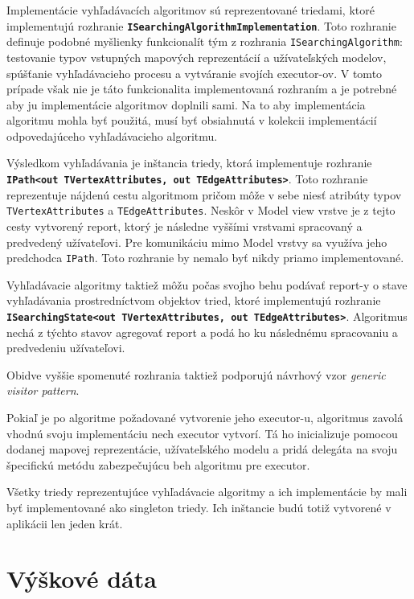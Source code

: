 Implementácie vyhľadávacích algoritmov sú reprezentované triedami, ktoré implementujú rozhranie \textbf{\texttt{ISearchingAlgorithmImplementation}}. Toto rozhranie definuje podobné myšlienky funkcionalít tým z rozhrania \texttt{ISearchingAlgorithm}: testovanie typov vstupných mapových reprezentácií a užívateľských modelov, spúšťanie vyhľadávacieho procesu a vytváranie svojích executor-ov. V tomto prípade však nie je táto funkcionalita implementovaná rozhraním a je potrebné aby ju implementácie algoritmov doplnili sami. Na to aby implementácia algoritmu mohla byť použitá, musí byť obsiahnutá v kolekcii implementácií odpovedajúceho vyhľadávacieho algoritmu. 

Výsledkom vyhľadávania je inštancia triedy, ktorá implementuje rozhranie \textbf{\texttt{IPath<out TVertexAttributes, out TEdgeAttributes>}}. Toto rozhranie reprezentuje nájdenú cestu algoritmom pričom môže v sebe niesť atribúty typov \texttt{TVertexAttributes} a \texttt{TEdgeAttributes}. Neskôr v Model view vrstve je z tejto cesty vytvorený report, ktorý je následne vyššími vrstvami spracovaný a predvedený užívateľovi. Pre komunikáciu mimo Model vrstvy sa využíva jeho predchodca \texttt{IPath}. Toto rozhranie by nemalo byť nikdy priamo implementované. 

Vyhľadávacie algoritmy taktiež môžu počas svojho behu podávať report-y o stave vyhľadávania prostredníctvom objektov tried, ktoré implementujú rozhranie \textbf{\texttt{ISearchingState<out TVertexAttributes, out TEdgeAttributes>}}. Algoritmus nechá z týchto stavov agregovať report a podá ho ku následnému spracovaniu a predvedeniu užívateľovi.

Obidve vyššie spomenuté rozhrania taktiež podporujú návrhový vzor \textit{generic visitor pattern}. 

Pokiaľ je po algoritme požadované vytvorenie jeho executor-u, algoritmus zavolá vhodnú svoju implementáciu nech executor vytvorí. Tá ho inicializuje pomocou dodanej mapovej reprezentácie, užívateľského modelu a pridá delegáta na svoju špecifickú metódu zabezpečujúcu beh algoritmu pre executor.

Všetky triedy reprezentujúce vyhľadávacie algoritmy a ich implementácie by mali byť implementované ako singleton triedy. Ich inštancie budú totiž vytvorené v aplikácii len jeden krát.

\section{Výškové dáta}

